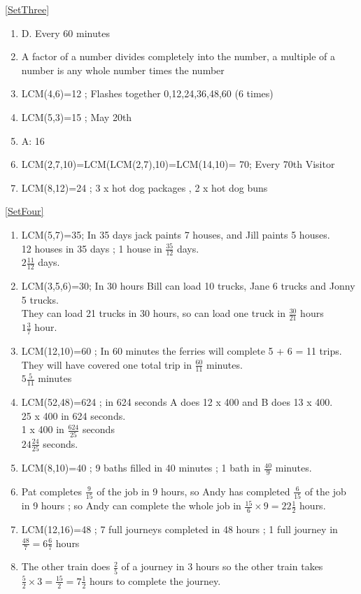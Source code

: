 \documentclass[a4paper,12pt]{article}
\begin{document}
\ref{SetThree}
\begin{enumerate}
	\item D. Every 60 minutes
	\item A factor of a number divides completely into the number, a multiple of a number is any whole number times the number
	\item LCM(4,6)=12 ; Flashes together 0,12,24,36,48,60 (6 times)
	\item LCM(5,3)=15 ; May 20th
	\item A: 16
	\item LCM(2,7,10)=LCM(LCM(2,7),10)=LCM(14,10)= 70; Every 70th Visitor
	\item LCM(8,12)=24 ; 3 x hot dog packages , 2 x hot dog buns
\end{enumerate}
\ref{SetFour}
\begin{enumerate}
	\item LCM(5,7)=35; In 35 days jack paints 7 houses, and Jill paints 5 houses.\\
	12 houses in 35 days ; 1 house in $\frac{35}{12}$ days. \\
	$2 \frac{11}{12}$ days.
	\item LCM(3,5,6)=30; In 30 hours Bill can load 10 trucks, Jane 6 trucks and Jonny 5 trucks.\\
	They can load 21 trucks in 30 hours, so can load one truck in $\frac{30}{21}$ hours\\
	$1\frac{3}{7}$ hour.
	\item LCM(12,10)=60 ; In 60 minutes the ferries will complete 5 + 6 = 11 trips.\\
	They will have covered one total trip in $\frac{60}{11}$ minutes.\\
	$5\frac{5}{11}$ minutes
	\item LCM(52,48)=624 ; in 624 seconds A does 12 x 400 and B does 13 x 400.\\
	25 x 400 in 624 seconds.\\
	1 x 400 in $\frac{624}{25}$ seconds\\
	$24\frac{24}{25}$ seconds.
	\item LCM(8,10)=40 ; 9 baths filled in 40 minutes ; 1 bath in $\frac{40}{9}$ minutes.
	\item Pat completes $\frac{9}{15}$ of the job in 9 hours, so Andy has completed $\frac{6}{15}$ of the job in 9 hours ; so Andy can complete the whole job in $\frac{15}{6}\times 9 = 22\frac{1}{2}$ hours.
	\item LCM(12,16)=48 ; 7 full journeys completed in 48 hours ; 1 full journey in $\frac{48}{7}=6\frac{6}{7}$ hours
	\item The other train does $\frac{2}{5}$ of a journey in 3 hours so the other train takes $\frac{5}{2}\times 3 =\frac{15}{2}= 7\frac{1}{2}$ hours to complete the journey.
\end{enumerate}
\end{document}
